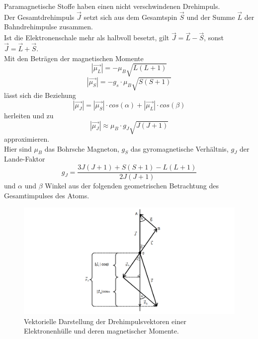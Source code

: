 Paramagnetische Stoffe haben einen nicht verschwindenen Drehimpuls.\\
Der Gesamtdrehimpuls $\vec{J}$ setzt sich aus dem Gesamtspin $\vec{S}$ und der Summe $\vec{L}$ der Bahndrehimpulse zusammen.\\
Ist die Elektronenschale mehr als halbvoll besetzt, gilt $\vec{J} = \vec{L} - \vec{S}$, sonst $\vec{J} = \vec{L} + \vec{S}$.\\

Mit den Beträgen der magnetischen Momente 
\begin{equation*}
    |\vec{\mu_L}| = -\mu_B \sqrt{L(L+1)}
\end{equation*}
\begin{equation*}
    |\vec{\mu_S}| = - g_s \cdot \mu_B \sqrt{S(S+1)}
\end{equation*}
lässt sich die Beziehung 
\begin{equation*}
    |\vec{\mu_J}| = |\vec{\mu_S}| \cdot cos(\alpha) + |\vec{\mu_L}| \cdot cos(\beta)
\end{equation*}
herleiten und zu 
\begin{equation*}
    |\vec{\mu_J}| \approx \mu_B \cdot g_J \sqrt{J(J+1)}
\end{equation*}
approximieren.\\
Hier sind $\mu_B$ das Bohrsche Magneton, $g_S$ das gyromagnetische 
Verhältnis, $g_J$ der Lande-Faktor
\begin{equation}
    g_J = \frac{3J(J+1) + S(S+1) - L(L+1)}{2J(J+1)}
    \label{eq:gyromyro}
\end{equation}
und $\alpha$ und $\beta$ Winkel aus der folgenden geometrischen Betrachtung des Gesamtimpulses
des Atoms.\\
\begin{figure}
    \centering
    \includegraphics[width=\textwidth]{content/vec_theo.png}
    \caption{Vektorielle Darstellung der Drehimpulsvektoren einer Elektronenhülle und deren magnetischer Momente. \cite{sample}}
    \label{fig:vektoriell}
\end{figure}

